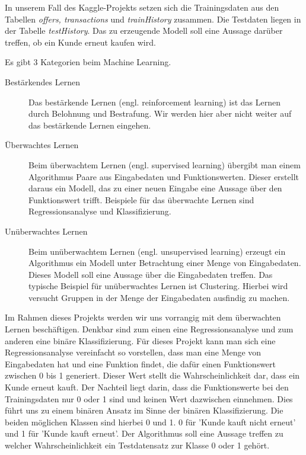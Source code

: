 In unserem Fall des Kaggle-Projekts setzen sich die Trainingsdaten aus den Tabellen \textit{offers, transactions} und \textit{trainHistory} zusammen. Die Testdaten liegen in der Tabelle \textit{testHistory}. Das zu erzeugende Modell soll eine Aussage darüber treffen, ob ein Kunde erneut kaufen wird.

Es gibt 3 Kategorien beim Machine Learning.

\begin{description}
\item[Bestärkendes Lernen] Das bestärkende Lernen (engl. reinforcement learning) ist das Lernen durch Belohnung und Bestrafung. Wir werden hier aber nicht weiter auf das bestärkende Lernen eingehen.

\item [Überwachtes Lernen] Beim überwachtem Lernen (engl. supervised learning) übergibt man einem Algorithmus Paare aus Eingabedaten und Funktionswerten. Dieser erstellt daraus ein Modell, das zu einer neuen Eingabe eine Aussage über den Funktionswert trifft. Beispiele für das überwachte Lernen sind Regressionsanalyse und Klassifizierung.

\item[Unüberwachtes Lernen] Beim unüberwachtem Lernen (engl. unsupervised learning) erzeugt ein Algorithmus ein Modell unter Betrachtung einer Menge von Eingabedaten. Dieses Modell soll eine Aussage über die Eingabedaten treffen. Das typische Beispiel für unüberwachtes Lernen ist Clustering. Hierbei wird versucht Gruppen in der Menge der Eingabedaten ausfindig zu machen.
\end{description}
 
Im Rahmen dieses Projekts werden wir uns vorrangig mit dem überwachten Lernen beschäftigen. Denkbar sind zum einen eine Regressionsanalyse und zum anderen eine binäre Klassifizierung. Für dieses Projekt kann man sich eine Regressionsanalyse vereinfacht so vorstellen, dass man eine Menge von Eingabedaten hat und eine Funktion findet, die dafür einen Funktionswert zwischen 0 bis 1 generiert. Dieser Wert stellt die Wahrscheinlichkeit dar, dass ein Kunde erneut kauft. Der Nachteil liegt darin, dass die Funktionswerte  bei den Trainingsdaten nur 0 oder 1 sind und keinen Wert dazwischen einnehmen. Dies führt uns zu einem binären Ansatz im Sinne der binären Klassifizierung. Die beiden möglichen Klassen sind hierbei 0 und 1. 0 für 'Kunde kauft nicht erneut' und 1 für 'Kunde kauft erneut'. Der Algorithmus soll eine Aussage treffen zu welcher Wahrscheinlichkeit ein Testdatensatz zur Klasse 0 oder 1 gehört.

